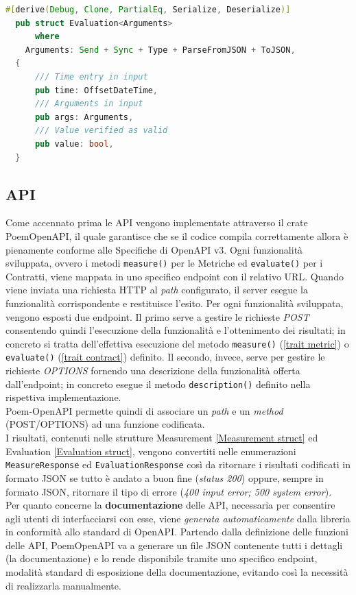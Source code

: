 \begin{lstlisting}[language=Rust, caption= Evaluation Struct \label{Evaluation struct}, basicstyle=\ttfamily ]
  #[derive(Debug, Clone, PartialEq, Serialize, Deserialize)]
  pub struct Evaluation<Arguments>
      where
    Arguments: Send + Sync + Type + ParseFromJSON + ToJSON,
  {
      /// Time entry in input
      pub time: OffsetDateTime,
      /// Arguments in input
      pub args: Arguments,
      /// Value verified as valid
      pub value: bool,
  }
\end{lstlisting}

\subsection{API}
Come accennato prima le \gls{API} vengono implementate attraverso il crate PoemOpenAPI, il quale garantisce che se il codice compila correttamente allora è pienamente conforme alle Specifiche di OpenAPI v3.
Ogni funzionalità sviluppata, ovvero i metodi \texttt{measure()} per le Metriche ed \texttt{evaluate()} per i Contratti, viene mappata in uno specifico endpoint con il relativo \gls{URL}. Quando viene inviata una richiesta HTTP al \emph{path} configurato, il server esegue la funzionalità corrispondente e restituisce l'esito.
Per ogni funzionalità sviluppata, vengono esposti due endpoint.
Il primo serve a gestire le richieste \emph{POST} consentendo quindi l'esecuzione della funzionalità e l'ottenimento dei risultati; in concreto si tratta dell'effettiva esecuzione del metodo \texttt{measure()} (\ref{trait metric}) o \texttt{evaluate()} (\ref{trait contract}) definito. Il secondo, invece, serve per gestire le richieste \emph{OPTIONS} fornendo una descrizione della funzionalità offerta dall'endpoint; in concreto esegue il metodo \texttt{description()} definito nella rispettiva implementazione.  \\
Poem-OpenAPI permette quindi di associare un \emph{path} e un \emph{method} (POST/OPTIONS) ad una funzione codificata. \\
I risultati, contenuti nelle strutture Measurement \ref{Measurement struct} ed Evaluation \ref{Evaluation struct}, vengono convertiti nelle enumerazioni \texttt{MeasureResponse} ed \texttt{EvaluationResponse} così da ritornare i risultati codificati in formato JSON se tutto è andato a buon fine (\textit{status 200}) oppure, sempre in formato JSON, ritornare il tipo di errore (\textit{400 input error; 500 system error}). \\
Per quanto concerne la \textbf{documentazione} delle API, necessaria per consentire agli utenti di interfacciarsi con esse, viene \emph{generata automaticamente} dalla libreria in conformità allo standard di OpenAPI.
Partendo dalla definizione delle funzioni delle \gls{API}, PoemOpenAPI va a generare un file JSON contenente tutti i dettagli (la documentazione) e lo rende  disponibile tramite uno specifico endpoint, modalità standard di esposizione della documentazione, evitando così la necessità di realizzarla manualmente.


